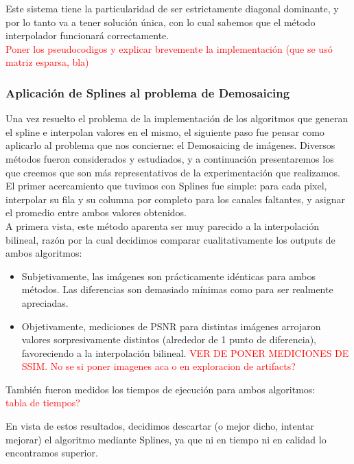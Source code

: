 \documentclass[a4paper]{article}
\begin{document}
Este sistema tiene la particularidad de ser estrictamente diagonal dominante, y por lo tanto va a tener solución única, con lo cual sabemos que el método interpolador funcionará correctamente. \\


\textcolor{red}{Poner los pseudocodigos y explicar brevemente la implementación (que se usó matriz esparsa, bla)\\}


\subsubsection*{Aplicación de Splines al problema de Demosaicing}

Una vez resuelto el problema de la implementación de los algoritmos que generan el spline e interpolan valores en el mismo, el siguiente paso fue pensar como aplicarlo al problema que nos concierne: el Demosaicing de imágenes. Diversos métodos fueron considerados y estudiados, y a continuación presentaremos los que creemos que son más representativos de la experimentación que realizamos. \\

El primer acercamiento que tuvimos con Splines fue simple: para cada pixel, interpolar su fila y su columna por completo para los canales faltantes, y asignar el promedio entre ambos valores obtenidos. \\
A primera vista, este método aparenta ser muy parecido a la interpolación bilineal, razón por la cual decidimos comparar cualitativamente los outputs de ambos algoritmos:
\begin{itemize}
\item Subjetivamente, las imágenes son prácticamente idénticas para ambos métodos. Las diferencias son demasiado mínimas como para ser realmente apreciadas.
\item Objetivamente, mediciones de PSNR para distintas imágenes arrojaron valores sorpresivamente distintos (alrededor de 1 punto de diferencia), favoreciendo a la interpolación bilineal. \textcolor{red}{VER DE PONER MEDICIONES DE SSIM. No se si poner imagenes aca o en exploracion de artifacts?}
\end{itemize}

También fueron medidos los tiempos de ejecución para ambos algoritmos:\\

\textcolor{red}{tabla de tiempos?\\}

En vista de estos resultados, decidimos descartar (o mejor dicho, intentar mejorar) el algoritmo mediante Splines, ya que ni en tiempo ni en calidad lo encontramos superior.\\
\end{document}
